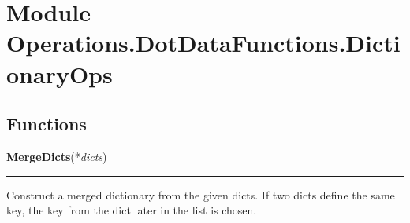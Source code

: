 %
%
%


\section{Module Operations.DotDataFunctions.DictionaryOps}

    \label{Operations:DotDataFunctions:DictionaryOps}


  \subsection{Functions}

    \label{Operations:DotDataFunctions:DictionaryOps:MergeDicts}

    \vspace{0.5ex}

\hspace{.8\funcindent}\begin{boxedminipage}{\funcwidth}

    \raggedright \textbf{MergeDicts}(*\textit{dicts})

    \vspace{-1.5ex}

    \rule{\textwidth}{0.5\fboxrule}
\setlength{\parskip}{2ex}
    Construct a merged dictionary from the given dicts. If two dicts define
    the same key, the key from the dict later in the list is chosen.

\setlength{\parskip}{1ex}
    \end{boxedminipage}

